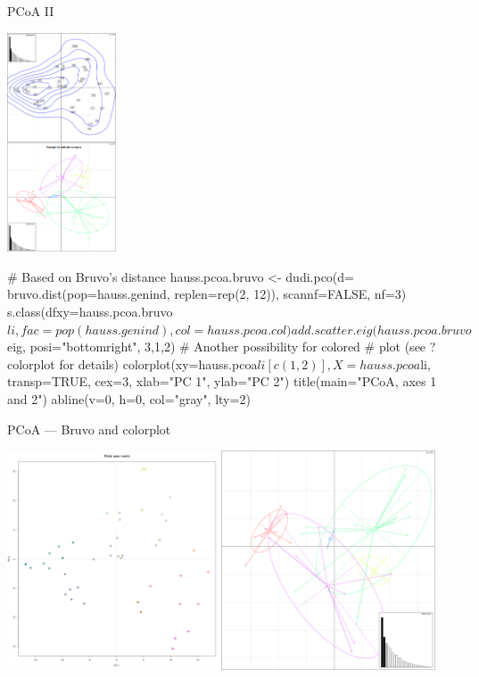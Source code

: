 \documentclass[compress, ucs, xelatex, 11pt, xcolor=svgnames, aspectratio=169,
	hyperref={
		bookmarks=true,
		unicode=true,
		colorlinks=true,
		pdftitle={Molecular data in R},
		plainpages=false,
		pdfauthor={Vojtech Zeisek},
		pdfsubject={Course about phylogeny and evolution in R},
		pdfcreator={XeLaTeX},
		pdfkeywords={R, evolution, phylogeny, molecular data},
		linkcolor=Crimson, %
		anchorcolor=Magenta, %
		citecolor=Magenta, %
		filecolor=Magenta, %
		menucolor=Magenta, %
		urlcolor=DodgerBlue, %
		pdftex},
	url={hyphens, lowtilde} %
	]{beamer}
\begin{document}
\begin{frame}[fragile]{PCoA II}
	\begin{multicols}{2}
		\begin{center}
			\includegraphics[height=6.5cm]{pcoa.png}
		\end{center}
		\columnbreak
		\begin{spluscode}
    # Based on Bruvo's distance
    hauss.pcoa.bruvo <- dudi.pco(d=
      bruvo.dist(pop=hauss.genind,
      replen=rep(2, 12)),
      scannf=FALSE, nf=3)
    s.class(dfxy=hauss.pcoa.bruvo$li,
      fac=pop(hauss.genind),
      col=hauss.pcoa.col)
    add.scatter.eig(hauss.pcoa.bruvo$
      eig, posi="bottomright", 3,1,2)
    # Another possibility for colored
    # plot (see ?colorplot for details)
    colorplot(xy=hauss.pcoa$li[c(1,2)],
      X=hauss.pcoa$li, transp=TRUE,
      cex=3, xlab="PC 1", ylab="PC 2")
    title(main="PCoA, axes 1 and 2")
    abline(v=0, h=0, col="gray", lty=2)
		\end{spluscode}
	\end{multicols}
\end{frame}

\begin{frame}{PCoA --- Bruvo and colorplot}
	\begin{center}
		\includegraphics[height=6.5cm]{pcoa-dalsi.png}
	\end{center}
\end{frame}
\end{document}
